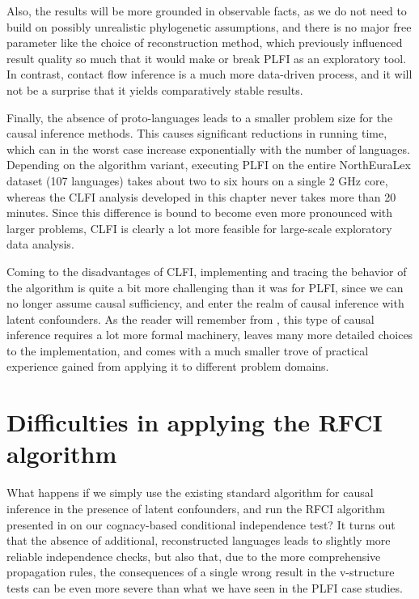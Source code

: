 Also, the results will be more grounded in observable facts, as we do not need to build on possibly unrealistic phylogenetic assumptions, and there is no major free parameter like the choice of reconstruction method, which previously influenced result quality so much that it would make or break PLFI as an exploratory tool. In contrast, contact flow inference is a much more data-driven process, and it will not be a surprise that it yields comparatively stable results.

Finally, the absence of proto-languages leads to a smaller problem size for the causal inference methods. This causes significant reductions in running time, which can in the worst case increase exponentially with the number of languages. Depending on the algorithm variant, executing PLFI on the entire NorthEuraLex dataset (107 languages) takes about two to six hours on a single 2 GHz core, whereas the CLFI analysis developed in this chapter never takes more than 20 minutes. Since this difference is bound to become even more pronounced with larger problems, CLFI is clearly a lot more feasible for large-scale exploratory data analysis.

Coming to the disadvantages of CLFI, implementing and tracing the behavior of the algorithm is quite a bit more challenging than it was for PLFI, since we can no longer assume causal sufficiency, and enter the realm of causal inference with latent confounders. As the reader will remember from , this type of causal inference requires a lot more formal machinery, leaves many more detailed choices to the implementation, and comes with a much smaller trove of practical experience gained from applying it to different problem domains.

\section{Difficulties in applying the RFCI algorithm}\label{sec:7.3}
What happens if we simply use the existing standard algorithm for causal inference in the presence of latent confounders, and run the RFCI algorithm presented in  on our cognacy-based conditional independence test? It turns out that the absence of additional, reconstructed languages leads to slightly more reliable independence checks, but also that, due to the more comprehensive propagation rules, the consequences of a single wrong result in the v-structure tests can be even more severe than what we have seen in the PLFI case studies.

